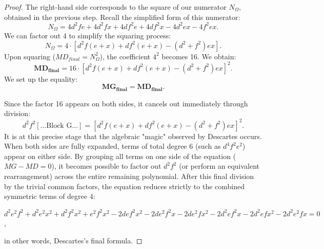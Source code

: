 \documentclass[12pt]{article}
\theoremstyle{définition}
\theoremstyle{remark}
\theoremstyle{plain}
\theoremstyle{plain}
\begin{document}
\begin{proof}
The right-hand side corresponds to the square of our numerator \(N_{\Omega }\), obtained in the previous step. Recall the simplified form of this numerator:
\[
N_{\Omega }=4d^{2}fe+4d^{2}fx+4df^{2}e+4df^{2}x-4d^{2}ex-4f^{2}ex.
\] 
We can factor out \(4\) to simplify the squaring process:
\[
N_{\Omega }=4\cdot \left[d^{2}f(e+x)+df^{2}(e+x)-(d^{2}+f^{2})ex\right].
\]
Upon squaring (\(MD_{final} = N_{\Omega}^2\)), the coefficient \(4^{2}\) becomes 16. We obtain:
\[
\mathbf{MD}_{\mathbf{final}}=16\cdot \left[d^{2}f(e+x)+df^{2}(e+x)-(d^{2}+f^{2})ex\right]^{2}.
\]
We set up the equality:
\[
\mathbf{MG}_{\mathbf{final}}\mathbf{=MD}_{\mathbf{final}}.
\]

Since the factor 16 appears on both sides, it cancels out immediately through division:
\[
d^{2}f^{2}\left[\dots \text{Block\ G}\dots \right]=\left[d^{2}f(e+x)+df^{2}(e+x)-(d^{2}+f^{2})ex\right]^{2}. 
\]
It is at this precise stage that the algebraic "magic" observed by Descartes occurs. When both sides are fully expanded, terms of total degree 6 (such as \(d^{4}f^{2}e^{2}\)) appear on either side. By grouping all terms on one side of the equation (\(MG - MD = 0\)), it becomes possible to factor out \(d^{2}f^{2}\) (or perform an equivalent rearrangement) across the entire remaining polynomial. After this final division by the trivial common factors, the equation reduces strictly to the combined symmetric terms of degree 4:

\(d^{2}e^{2}f^{2}+d^{2}e^{2}x^{2}+d^{2}f^{2}x^{2}+e^{2}f^{2}x^{2}-2def^{2}x^{2}-2de^{2}f^{2}x-2de^{2}fx^{2}-2d^{2}ef^{2}x-2d^{2}efx^{2}-2d^{2}e^{2}fx=0\),

in other words, Descartes's final formula.
\end{proof}
\end{document}
